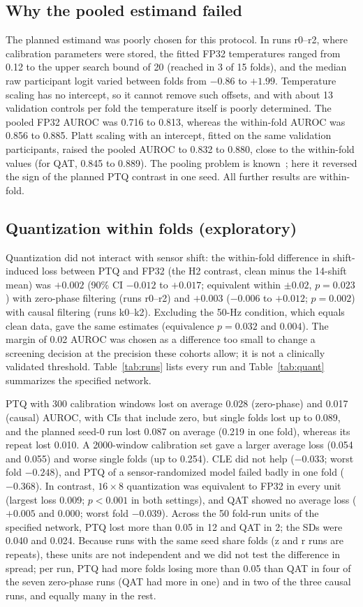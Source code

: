 \documentclass[preprint,12pt]{elsarticle}
\begin{document}
\subsection{Why the pooled estimand failed}
\label{sec:pool}
The planned estimand was poorly chosen for this protocol. In runs r0--r2, where calibration parameters were stored, the fitted FP32 temperatures ranged from 0.12 to the upper search bound of 20 (reached in 3 of 15 folds), and the median raw participant logit varied between folds from $-0.86$ to $+1.99$. Temperature scaling has no intercept, so it cannot remove such offsets, and with about 13 validation controls per fold the temperature itself is poorly determined. The pooled FP32 AUROC was 0.716 to 0.813, whereas the within-fold AUROC was 0.856 to 0.885. Platt scaling with an intercept, fitted on the same validation participants, raised the pooled AUROC to 0.832 to 0.880, close to the within-fold values (for QAT, 0.845 to 0.889). The pooling problem is known~\cite{Forman2010,Airola2011,Fawcett2006}; here it reversed the sign of the planned PTQ contrast in one seed. All further results are within-fold.

\subsection{Quantization within folds (exploratory)}
Quantization did not interact with sensor shift: the within-fold difference in shift-induced loss between PTQ and FP32 (the H2 contrast, clean minus the 14-shift mean) was $+0.002$ (90\% CI $-0.012$ to $+0.017$; equivalent within $\pm0.02$, $p=0.023$) with zero-phase filtering (runs r0--r2) and $+0.003$ ($-0.006$ to $+0.012$; $p=0.002$) with causal filtering (runs k0--k2). Excluding the 50-Hz condition, which equals clean data, gave the same estimates (equivalence $p=0.032$ and $0.004$). The margin of 0.02 AUROC was chosen as a difference too small to change a screening decision at the precision these cohorts allow; it is not a clinically validated threshold. Table~\ref{tab:runs} lists every run and Table~\ref{tab:quant} summarizes the specified network.

PTQ with 300 calibration windows lost on average 0.028 (zero-phase) and 0.017 (causal) AUROC, with CIs that include zero, but single folds lost up to 0.089, and the planned seed-0 run lost 0.087 on average (0.219 in one fold), whereas its repeat lost 0.010. A 2000-window calibration set gave a larger average loss (0.054 and 0.055) and worse single folds (up to 0.254). CLE did not help ($-0.033$; worst fold $-0.248$), and PTQ of a sensor-randomized model failed badly in one fold ($-0.368$). In contrast, $16\times8$ quantization was equivalent to FP32 in every unit (largest loss 0.009; $p<0.001$ in both settings), and QAT showed no average loss ($+0.005$ and $0.000$; worst fold $-0.039$). Across the 50 fold-run units of the specified network, PTQ lost more than 0.05 in 12 and QAT in 2; the SDs were 0.040 and 0.024. Because runs with the same seed share folds (z and r runs are repeats), these units are not independent and we did not test the difference in spread; per run, PTQ had more folds losing more than 0.05 than QAT in four of the seven zero-phase runs (QAT had more in one) and in two of the three causal runs, and equally many in the rest.
\end{document}
